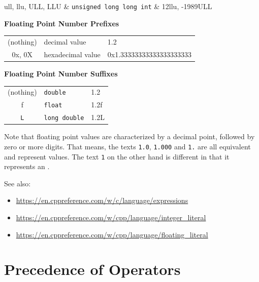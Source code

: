 \begin{appendices}
{\begin{tabularx}
	ull\textrm{,} llu\textrm{,} ULL\textrm{,} LLU &
	\centering \texttt{unsigned long long int} &
	12llu\textrm{,} -1989ULL
\end{tabularx}

\vspace{12pt}
\textbf{Floating Point Number Prefixes} \\
\begin{tabularx}
	{\linewidth}
	{CXZ}
	\textrm{(nothing)} & 
	\centering decimal value &
	1.2
	\\
	
	0x\textrm{,} 0X &
	\centering hexadecimal value &
	0x1.33333333333333333333
\end{tabularx}

\vspace{12pt}
\textbf{Floating Point Number Suffixes} \\
\begin{tabularx}
	{\linewidth}
	{CXZ}
	
	\textrm{(nothing)} & 
	\centering \texttt{double} &
	1.2
	\\
	
	f & 
	\centering \texttt{float} &
	1.2f
	\\
	
	\centering \texttt{L} & 
	\centering \texttt{long double} &
	1.2L
	\\
	
	\bottomrule[1.5pt]
\end{tabularx}

\label{tab:LiteralFormat}
}
Note that floating point values are characterized by a decimal point, followed by zero or more digits. That means, the texts \texttt{1.0}, \texttt{1.000} and \texttt{1.} are all equivalent and represent  values. The text \texttt{1} on the other hand is different in that it represents an .

See also:
\begin{itemize}
\item \url{https://en.cppreference.com/w/c/language/expressions}
\item \url{https://en.cppreference.com/w/cpp/language/integer_literal}
\item \url{https://en.cppreference.com/w/cpp/language/floating_literal}
\end{itemize}
\vfill

\section{Precedence of Operators}
{
\begin{tabularx}
		{\linewidth}
		{POD}
		\toprule[1pt]


\end{tabularx}}
\end{appendices}
